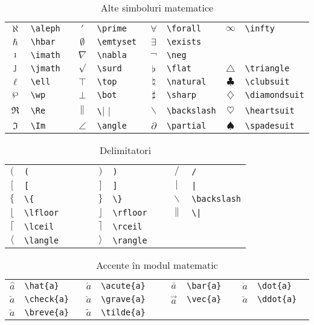 \documentclass{article}
\begin{document}
\begin{table}
\begin{tabular}{clclclcl}
$\aleph$    &\verb|\aleph       |&$\prime$   &\verb|\prime    |&$\forall$        &\verb|\forall   |     &$\infty$ &\verb|\infty|\\
$\hbar$    &\verb|\hbar       |&$\emptyset$   &\verb|\emtyset    |&$\exists$  &\verb|\exists  |\\
$\imath$ &\verb|\imath    |&$\nabla$ &\verb|\nabla  |&$\neg$&\verb|\neg|\\
$\jmath$   &\verb|\jmath      |&$\surd$ &\verb|\surd  |&$\flat$   &\verb|\flat   |&$\triangle$&\verb|\triangle|\\
$\ell$   &\verb|\ell      |&$\top$ &\verb|\top  |&$\natural$  &\verb|\natural  |&$\clubsuit$  &\verb|\clubsuit|\\
$\wp$  &\verb|\wp     |&$\bot$   &\verb|\bot    |&$\sharp$        &\verb|\sharp|&$\diamondsuit$&\verb|\diamondsuit|\\
$\Re$  &\verb|\Re     |&$\|$ &\verb|\|  |&$\backslash$         &\verb|\backslash|&$\heartsuit$         &\verb|\heartsuit|\\
$\Im$&\verb|\Im   |&$\angle$&\verb|\angle  |&$\partial$&\verb|\partial|&$\spadesuit$         &\verb|\spadesuit|\\
\end{tabular}
\caption{Alte simboluri matematice}
\end{table}
\par

\begin{table}
\begin{tabular}{clclcl}
$($&\verb.( .&$)$&\verb.)   .&$/$&\verb./  .  \\
$[$    &\verb.[       .&$]$&\verb.]   .&$|$&\verb.| .\\
$\{$ &\verb.\{   .&$\}$&\verb.\}  .&$\backslash$&\verb.\backslash.\\
$\lfloor$&\verb.\lfloor      .&$\rfloor$&\verb.\rfloor  .&$\|$&\verb.\|.\\
$\lceil$&\verb.\lceil   .&$\rceil$&\verb.\rceil   .\\
$\langle$&\verb.\langle   .&$\rangle$&\verb.\rangle   .\\
\end{tabular}
\caption{Delimitatori}
\end{table}
\par

\begin{table}
\begin{tabular}{clclclcl}
$\hat{a}$&\verb|\hat{a}  |&$\acute{a}$&\verb|\acute{a}    |&$\bar{a}$&\verb|\bar{a}   |&$\dot{a}$&\verb|\dot{a}|\\
$\check{a}$&\verb|\check{a}  |&$\grave{a}$&\verb|\grave{a}    |&$\vec{a}$&\verb|\vec{a}  |&$\ddot{a}$&\verb|\ddot{a}  |\\
$\breve{a}$&\verb|\breve{a}  |&$\tilde{a}$ &\verb|\tilde{a}  |\\
\end{tabular}
\caption{Accente în modul matematic}
\end{table}
\par
\end{document}
